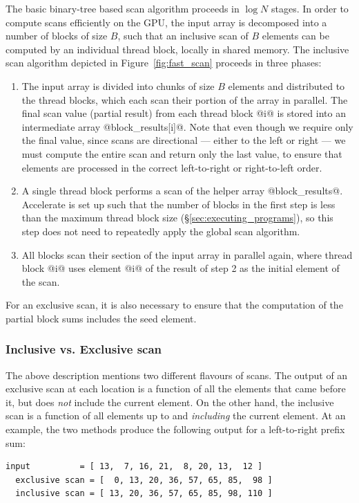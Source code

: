 The basic binary-tree based scan algorithm proceeds in $\log
N$ stages.
In order to compute scans efficiently on the GPU\gpu{}, the input array is
decomposed into a number of blocks of size $B$, such that an inclusive scan of
$B$ elements can be computed by an individual thread block,
locally in shared memory\cuda{}. The inclusive scan
algorithm depicted in Figure~\ref{fig:fast_scan} proceeds in three phases:
%
\begin{enumerate}
\item The input array is divided into chunks of size $B$ elements and
    distributed to the thread blocks, which each scan their
    portion of the array in parallel. The final scan value (partial result) from
    each thread block @i@ is stored into an intermediate array
    @block_results[i]@. Note that even though we require only the final value,
    since scans are directional --- either to the left or right --- we must
    compute the entire scan and return only the last value, to ensure that
    elements are processed in the correct left-to-right or right-to-left order.

\item A single thread block performs a scan of the helper array @block_results@.
    Accelerate is set up such that the number of blocks in the first step is
    less than the maximum thread block size (\S\ref{sec:executing_programs}), so
    this step does not need to repeatedly apply the global scan algorithm.

\item All blocks scan their section of the input array in parallel again, where
    thread block @i@ uses element @i@ of the result of step 2 as the initial
    element of the scan.

\end{enumerate}

For an exclusive scan, it is also necessary to ensure that the computation of
the partial block sums includes the seed element.


\subsubsection{Inclusive vs. Exclusive scan}

The above description mentions two different flavours of scans. The output of an
exclusive scan at each location is a function of all the elements that came
before it, but does \emph{not} include the current element. On the other hand,
the inclusive scan is a function of all elements up to and \emph{including} the
current element. At an example, the two methods produce the following output for
a left-to-right prefix sum:
%
\begin{lstlisting}[style=haskell]
  input          = [ 13,  7, 16, 21,  8, 20, 13,  12 ]
  exclusive scan = [  0, 13, 20, 36, 57, 65, 85,  98 ]
  inclusive scan = [ 13, 20, 36, 57, 65, 85, 98, 110 ]
\end{lstlisting}

